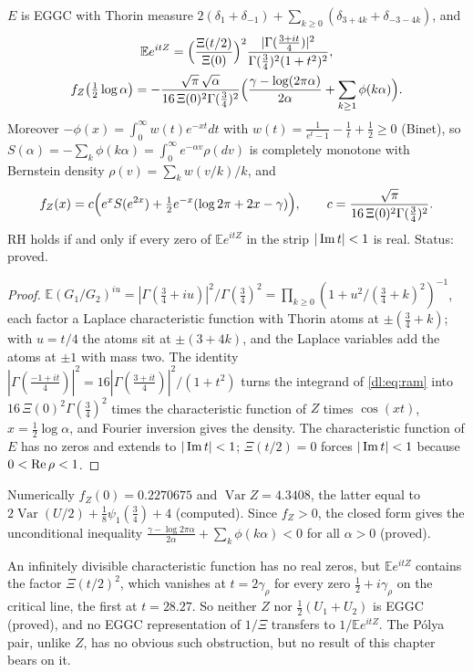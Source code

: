 \begin{theorem}\label{dl:thm:Z}
$E$ is EGGC with Thorin measure $2(\delta_1+\delta_{-1})+\sum_{k\ge0}(\delta_{3+4k}+\delta_{-3-4k})$, and
\begin{gather*}
\mathbb Ee^{itZ}=\Bigl(\frac{\Xi(t/2)}{\Xi(0)}\Bigr)^2\frac{|\Gamma(\frac{3+it}4)|^2}{\Gamma(\frac34)^2(1+t^2)^2},\\
f_Z\bigl(\tfrac12\log\alpha\bigr)=-\frac{\sqrt\pi\,\sqrt\alpha}{16\,\Xi(0)^2\Gamma(\frac34)^2}\Bigl(\frac{\gamma-\log(2\pi\alpha)}{2\alpha}+\sum_{k\ge1}\phi(k\alpha)\Bigr).
\end{gather*}
Moreover $-\phi(x)=\int_0^\infty w(t)e^{-xt}dt$ with $w(t)=\frac1{e^t-1}-\frac1t+\frac12\ge0$ (Binet), so $S(\alpha)=-\sum_k\phi(k\alpha)=\int_0^\infty e^{-\alpha v}\rho(dv)$ is completely monotone with Bernstein density $\rho(v)=\sum_kw(v/k)/k$, and
\[
f_Z(x)=c\Bigl(e^xS(e^{2x})+\tfrac12e^{-x}(\log2\pi+2x-\gamma)\Bigr),\qquad c=\frac{\sqrt\pi}{16\,\Xi(0)^2\Gamma(\frac34)^2}.
\]
RH holds if and only if every zero of $\mathbb Ee^{itZ}$ in the strip $|\operatorname{Im} t|<1$ is real. Status: proved.
\end{theorem}

\begin{proof}
$\mathbb E(G_1/G_2)^{iu}=|\Gamma(\frac34+iu)|^2/\Gamma(\frac34)^2=\prod_{k\ge0}(1+u^2/(\frac34+k)^2)^{-1}$, each factor a Laplace characteristic function with Thorin atoms at $\pm(\frac34+k)$; with $u=t/4$ the atoms sit at $\pm(3+4k)$, and the Laplace variables add the atoms at $\pm1$ with mass two. The identity $|\Gamma(\frac{-1+it}4)|^2=16|\Gamma(\frac{3+it}4)|^2/(1+t^2)$ turns the integrand of \eqref{dl:eq:ram} into $16\,\Xi(0)^2\Gamma(\frac34)^2$ times the characteristic function of $Z$ times $\cos(xt)$, $x=\frac12\log\alpha$, and Fourier inversion gives the density. The characteristic function of $E$ has no zeros and extends to $|\operatorname{Im} t|<1$; $\Xi(t/2)=0$ forces $|\operatorname{Im} t|<1$ because $0<\operatorname{Re}\rho<1$.
\end{proof}

Numerically $f_Z(0)=0.2270675$ and $\operatorname{Var}Z=4.3408$, the latter equal to $2\operatorname{Var}(U/2)+\frac18\psi_1(\frac34)+4$ (computed). Since $f_Z>0$, the closed form gives the unconditional inequality $\frac{\gamma-\log2\pi\alpha}{2\alpha}+\sum_k\phi(k\alpha)<0$ for all $\alpha>0$ (proved).

\begin{remark}\label{dl:rem:Zid}
An infinitely divisible characteristic function has no real zeros, but $\mathbb Ee^{itZ}$ contains the factor $\Xi(t/2)^2$, which vanishes at $t=2\gamma_\rho$ for every zero $\frac12+i\gamma_\rho$ on the critical line, the first at $t=28.27$. So neither $Z$ nor $\frac12(U_1+U_2)$ is EGGC (proved), and no EGGC representation of $1/\Xi$ transfers to $1/\mathbb Ee^{itZ}$. The P\'olya pair, unlike $Z$, has no obvious such obstruction, but no result of this chapter bears on it.
\end{remark}

